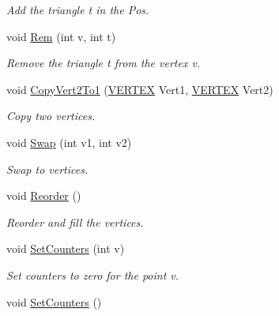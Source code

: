 \begin{DoxyCompactItemize}
\begin{DoxyCompactList}\small\item\em Add the triangle t in the Pos. \end{DoxyCompactList}\item 
void \hyperlink{classNeiVertex_a8c5cc8bfb6783d235a0b273821f5e475}{Rem} (int v, int t)\hypertarget{classNeiVertex_a8c5cc8bfb6783d235a0b273821f5e475}{}\label{classNeiVertex_a8c5cc8bfb6783d235a0b273821f5e475}

\begin{DoxyCompactList}\small\item\em Remove the triangle t from the vertex v. \end{DoxyCompactList}\item 
void \hyperlink{classNeiVertex_a2be4fa5175ea113c1762d2a4cbc21091}{Copy\+Vert2\+To1} (\hyperlink{structVERTEX}{V\+E\+R\+T\+EX} Vert1, \hyperlink{structVERTEX}{V\+E\+R\+T\+EX} Vert2)\hypertarget{classNeiVertex_a2be4fa5175ea113c1762d2a4cbc21091}{}\label{classNeiVertex_a2be4fa5175ea113c1762d2a4cbc21091}

\begin{DoxyCompactList}\small\item\em Copy two vertices. \end{DoxyCompactList}\item 
void \hyperlink{classNeiVertex_aa22b5926829059f1b8f5ee084497f2ab}{Swap} (int v1, int v2)\hypertarget{classNeiVertex_aa22b5926829059f1b8f5ee084497f2ab}{}\label{classNeiVertex_aa22b5926829059f1b8f5ee084497f2ab}

\begin{DoxyCompactList}\small\item\em Swap to vertices. \end{DoxyCompactList}\item 
void \hyperlink{classNeiVertex_aeeb3068ff4b57530bda6a4f1180fe383}{Reorder} ()\hypertarget{classNeiVertex_aeeb3068ff4b57530bda6a4f1180fe383}{}\label{classNeiVertex_aeeb3068ff4b57530bda6a4f1180fe383}

\begin{DoxyCompactList}\small\item\em Reorder and fill the vertices. \end{DoxyCompactList}\item 
void \hyperlink{classNeiVertex_a86a3208513ff31c3391998f4900f52b5}{Set\+Counters} (int v)
\begin{DoxyCompactList}\small\item\em Set counters to zero for the point v. \end{DoxyCompactList}\item 
void \hyperlink{classNeiVertex_a7c3a47a119b3c06d24a0c8a370fef66c}{Set\+Counters} ()\hypertarget{classNeiVertex_a7c3a47a119b3c06d24a0c8a370fef66c}{}\label{classNeiVertex_a7c3a47a119b3c06d24a0c8a370fef66c}


\end{DoxyCompactItemize}
